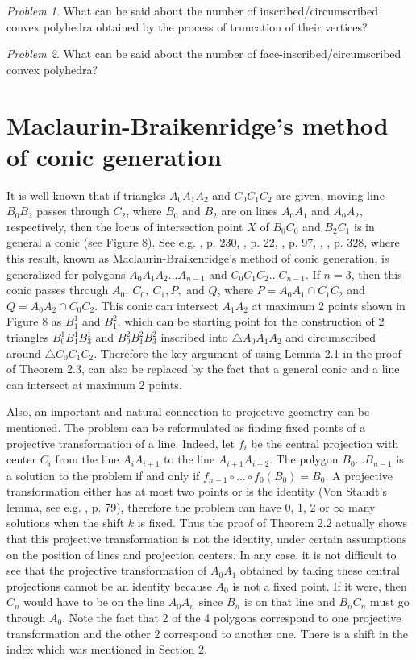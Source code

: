 \documentclass{birkjour}
\theoremstyle{definition}
\theoremstyle{remark}
\newtheorem{problem}{Problem}
\numberwithin{equation}{section}
\begin{document}
\begin{problem}
What can be said about the number of inscribed/circumscribed convex polyhedra obtained by the process of truncation of their vertices?
\end{problem}

\begin{problem}
What can be said about the number of face-inscribed/circumscribed convex polyhedra?
\end{problem}

\section{Maclaurin-Braikenridge's method of conic generation} 
It is well known that if triangles $A_0 A_1 A_2$ and $C_0 C_1 C_2$ are given, moving line $B_0B_2$ passes through $C_2$, where $B_0$ and $B_2$ are on lines $A_0A_1$ and $A_0A_2$, respectively, then the locus of intersection point $X$ of $B_0C_0$ and $B_2C_1$ is in general a conic (see Figure 8). See e.g. \cite{salmon}, p. 230, \cite{pamfil}, p. 22, \cite{pamfil2}, p. 97, \cite{wylie}, \cite{pedoe}, p. 328, where this result, known as Maclaurin-Braikenridge's method of conic generation, is generalized for polygons $A_0 A_1 A_2\ldots A_{n-1}$ and $C_0 C_1 C_2\dots C_{n-1}$. If $n=3$, then this conic passes through $A_0,\ C_0,\ C_1, P,$ and $Q$, where $P=A_0A_1\cap C_1C_2$ and $Q=A_0A_2\cap C_0C_2$. This conic can intersect $A_1A_2$ at maximum 2 points shown in Figure 8 as $B^1_1$ and $B^2_1$, which can be starting point for the construction of 2 triangles $B^1_0B^1_1B^1_3$ and  $B^2_0B^2_1B^2_3$ inscribed into $\triangle A_0 A_1 A_2$ and circumscribed around $\triangle C_0 C_1 C_2$. Therefore the key argument of using Lemma 2.1 in the proof of Theorem 2.3, can also be replaced by the fact that a general conic and a line can intersect at maximum 2 points.

Also, an important and natural connection to projective geometry can be mentioned. The problem can be reformulated as finding fixed points of a projective  transformation of a line. Indeed, let $f_i$ be the central projection with center $C_i$ from the line $A_iA_{i+1}$ to the line $A_{i+1}A_{i+2}$. The polygon $B_0\ldots B_{n-1}$ is a solution to the problem if and  only if $f_{n-1}\circ\ldots\circ f_0(B_0) = B_0$. A projective transformation either has at  most two points or is the identity (Von Staudt's lemma, see e.g. \cite{gur}, p. 79), therefore the problem can have 0, 1, 2 or  $\infty$ many solutions when the shift $k$ is fixed. Thus the proof of Theorem 2.2  actually shows that this projective transformation is not the identity, under certain assumptions on the position of lines and projection centers. In any case, it is not difficult to see that the projective transformation of $A_0A_1$ obtained by taking these central projections cannot be an identity because $A_0$ is not a fixed point. If it were, then $C_n$ would have to be on the line $A_0A_n$ since $B_n$ is on that line and $B_nC_n$ must go through $A_0$. Note the fact that 2 of the 4 polygons correspond to one projective transformation and the other 2 correspond to another one. There is a shift in the index which was mentioned in Section 2.
\end{document}
